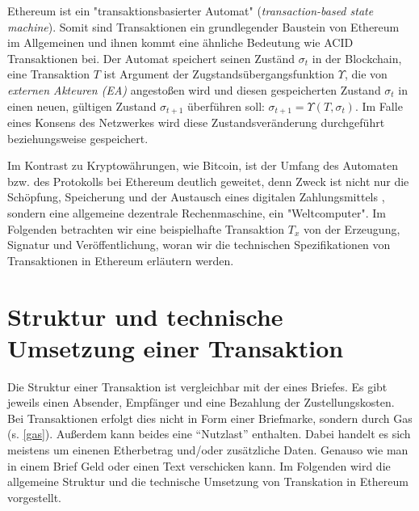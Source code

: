 \documentclass[runningheads]{llncs}
\begin{document}
Ethereum ist ein "transaktionsbasierter Automat" (\textit{transaction-based state machine}). Somit sind Transaktionen ein grundlegender Baustein von Ethereum im Allgemeinen und ihnen kommt eine ähnliche Bedeutung wie ACID Transaktionen bei. Der Automat speichert seinen Zuständ $ \sigma_t $ in der Blockchain, eine Transaktion $ T $ ist Argument der Zugstandsübergangsfunktion $ \Upsilon $, die von \textit{externen Akteuren (EA)} angestoßen wird und diesen gespeicherten Zustand $ \sigma_t $ in einen neuen, gültigen Zustand $ \sigma_{t + 1} $ überführen soll: $\sigma_{t+1} = \Upsilon(T, \sigma_t) $. Im Falle eines Konsens des Netzwerkes wird diese Zustandsveränderung durchgeführt beziehungsweise gespeichert.

Im Kontrast zu Kryptowährungen, wie Bitcoin, ist der Umfang des Automaten bzw. des Protokolls bei Ethereum deutlich geweitet, denn Zweck ist nicht nur die Schöpfung, Speicherung und der Austausch eines digitalen Zahlungsmittels \cite{nakamoto_bitcoin_nodate}, sondern eine allgemeine dezentrale Rechenmaschine, ein "Weltcomputer".  \cite[S. 1-4]{wood_ethereum/yellowpaper_2019} Im Folgenden betrachten wir eine beispielhafte Transaktion $ T_x $ von der Erzeugung, Signatur und Veröffentlichung, woran wir die technischen Spezifikationen von Transaktionen in Ethereum erläutern werden.

\section{Struktur und technische Umsetzung einer Transaktion}
Die Struktur einer Transaktion ist vergleichbar mit der eines Briefes. Es gibt jeweils einen Absender, Empfänger und eine Bezahlung der Zustellungskosten. Bei Transaktionen erfolgt dies nicht in Form einer Briefmarke, sondern durch Gas (s. \ref{gas}). Außerdem kann beides eine "`Nutzlast"' \cite[S. 108]{antonopoulos_mastering_2019} enthalten. Dabei handelt es sich meistens um einenen Etherbetrag und/oder zusätzliche Daten. Genauso wie man in einem Brief Geld oder einen Text verschicken kann. Im Folgenden wird die allgemeine Struktur und die technische Umsetzung von Transkation in Ethereum vorgestellt.
\end{document}

